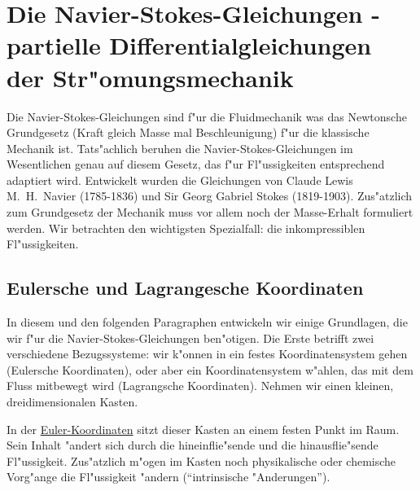  



\section{Die Navier-Stokes-Gleichungen - partielle Differentialgleichungen
der Str"omungsmechanik}


Die Navier-Stokes-Gleichungen sind f"ur die Fluidmechanik was das Newtonsche
Grundgesetz  (Kraft gleich Masse mal Beschleunigung) f"ur die klassische 
Mechanik ist. Tats"achlich beruhen die Navier-Stokes-Gleichungen im Wesentlichen 
genau auf diesem Gesetz, das f"ur Fl"ussigkeiten entsprechend adaptiert wird. 
Entwickelt wurden die Gleichungen von 
Claude Lewis M.\ H.\ Navier (1785-1836) und Sir Georg Gabriel Stokes 
(1819-1903). Zus"atzlich zum Grundgesetz der Mechanik muss vor allem noch der
Masse-Erhalt formuliert werden. Wir betrachten den wichtigsten Spezialfall: die 
inkompressiblen Fl"ussigkeiten. 
\subsection{Eulersche und Lagrangesche Koordinaten}
In diesem und den folgenden 
Paragraphen entwickeln wir einige Grundlagen, die wir f"ur die 
 Navier-Stokes-Gleichungen ben"otigen. Die Erste betrifft zwei verschiedene 
Bezugssysteme: wir k"onnen in ein festes Koordinatensystem gehen (Eulersche 
 Koordinaten), oder aber ein Koordinatensystem w"ahlen, das mit dem Fluss 
 mitbewegt wird (Lagrangsche Koordinaten). 
Nehmen wir einen kleinen, dreidimensionalen Kasten. 

In der \underline{Euler-Koordinaten} sitzt dieser Kasten
an einem festen Punkt im Raum. Sein Inhalt "andert sich durch die hineinflie"sende 
und die hinausflie"sende Fl"ussigkeit. Zus"atzlich m"ogen im Kasten noch physikalische 
oder chemische Vorg"ange die Fl"ussigkeit "andern
(``intrinsische "Anderungen'').

